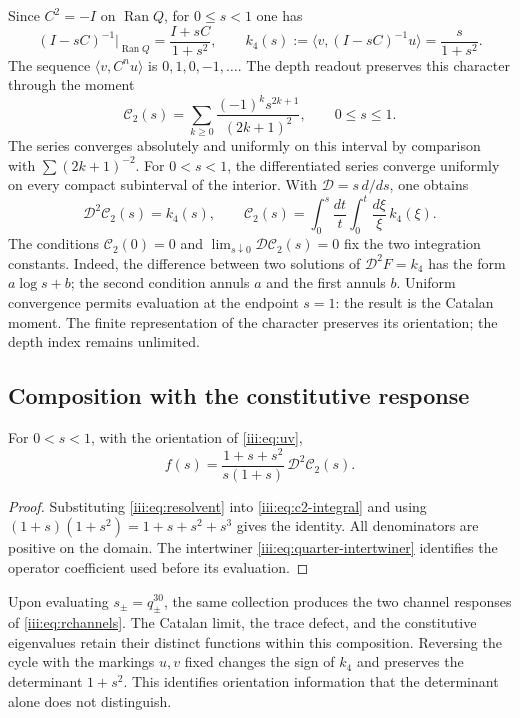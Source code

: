 Since $C^2=-I$ on $\operatorname{Ran}Q$, for $0\leq s<1$ one has
\begin{equation}
 (I-sC)^{-1}\big|_{\operatorname{Ran}Q}=\frac{I+sC}{1+s^2},
 \qquad k_4(s):=\langle v,(I-sC)^{-1}u\rangle=\frac{s}{1+s^2}.
 \label{iii:eq:resolvent}
\end{equation}
The sequence $\langle v,C^nu\rangle$ is $0,1,0,-1,\ldots$. The depth
readout preserves this character through the moment
\begin{equation}
 \mathcal C_2(s)=\sum_{k\geq0}\frac{(-1)^ks^{2k+1}}{(2k+1)^2},
 \qquad 0\leq s\leq1.
 \label{iii:eq:c2}
\end{equation}
The series converges absolutely and uniformly on this interval by
comparison with $\sum(2k+1)^{-2}$. For $0<s<1$, the differentiated series
converge uniformly on every compact subinterval of the interior. With
$\mathcal D=s\,d/ds$, one obtains
\begin{equation}
 \mathcal D^2\mathcal C_2(s)=k_4(s),\qquad
 \mathcal C_2(s)=\int_0^s\frac{dt}{t}\int_0^t\frac{d\xi}{\xi}\,k_4(\xi).
 \label{iii:eq:c2-integral}
\end{equation}
The conditions $\mathcal C_2(0)=0$ and
$\lim_{s\downarrow0}\mathcal D\mathcal C_2(s)=0$ fix the two integration
constants. Indeed, the difference between two solutions of
$\mathcal D^2F=k_4$ has the form $a\log s+b$; the second condition
annuls $a$ and the first annuls $b$.
Uniform convergence permits evaluation at the endpoint $s=1$: the result is
the Catalan moment. The finite representation of the character preserves its
orientation; the depth index remains unlimited.

\subsection{Composition with the constitutive response}

\begin{theorem}
For $0<s<1$, with the orientation of \eqref{iii:eq:uv},
\begin{equation}
 f(s)=\frac{1+s+s^2}{s(1+s)}\,\mathcal D^2\mathcal C_2(s).
 \label{iii:eq:catalan-vacuum}
\end{equation}
\end{theorem}
\begin{proof}
Substituting \eqref{iii:eq:resolvent} into \eqref{iii:eq:c2-integral} and using
$(1+s)(1+s^2)=1+s+s^2+s^3$ gives the identity. All denominators are
positive on the domain. The intertwiner \eqref{iii:eq:quarter-intertwiner}
identifies the operator coefficient used before its evaluation.
\end{proof}

Upon evaluating $s_\pm=q_\pm^{30}$, the same collection produces the two channel
responses of \eqref{iii:eq:rchannels}. The Catalan limit, the trace
defect, and the constitutive eigenvalues retain their distinct functions
within this composition. Reversing the cycle with the markings $u,v$
fixed changes the sign of $k_4$ and preserves the determinant $1+s^2$.
This identifies orientation information that the determinant
alone does not distinguish.
